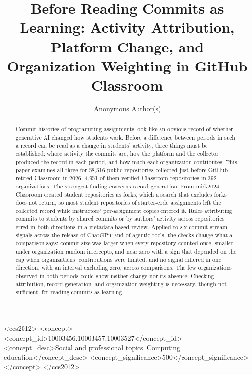 \documentclass[acmsmall,screen,review,anonymous]{acmart}
\begin{document}
\title[Before Reading Commits as Learning]{Before Reading Commits as Learning: Activity Attribution, Platform Change, and Organization Weighting in GitHub Classroom}

\author{Anonymous Author(s)}

\begin{abstract}
Commit histories of programming assignments look like an obvious record of whether generative AI changed how students work. Before a difference between periods in such a record can be read as a change in students' activity, three things must be established: whose activity the commits are, how the platform and the collector produced the record in each period, and how much each organization contributes. This paper examines all three for 58,516 public repositories collected just before GitHub retired Classroom in 2026, 4,951 of them verified Classroom repositories in 392 organizations. The strongest finding concerns record generation. From mid-2024 Classroom created student repositories as forks, which a search that excludes forks does not return, so most student repositories of starter-code assignments left the collected record while instructors' per-assignment copies entered it. Rules attributing commits to students by shared commits or by authors' activity across repositories erred in both directions in a metadata-based review. Applied to six commit-stream signals across the release of ChatGPT and of agentic tools, the checks change what a comparison says: commit size was larger when every repository counted once, smaller under organization random intercepts, and near zero with a sign that depended on the cap when organizations' contributions were limited, and no signal differed in one direction, with an interval excluding zero, across comparisons. The few organizations observed in both periods could show neither change nor its absence. Checking attribution, record generation, and organization weighting is necessary, though not sufficient, for reading commits as learning.
\end{abstract}

\begin{CCSXML}
<ccs2012>
<concept>
<concept_id>10003456.10003457.10003527</concept_id>
<concept_desc>Social and professional topics~Computing education</concept_desc>
<concept_significance>500</concept_significance>
</concept>
</ccs2012>
\end{CCSXML}
\end{document}

